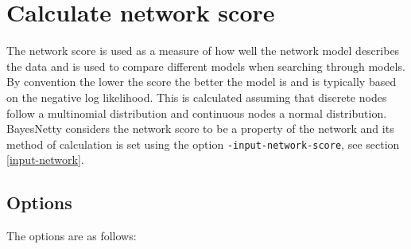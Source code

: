 \documentclass[a4paper,12pt]{article}
\newcommand{\code}[1]{{\footnotesize{{\tt #1}}}}
\begin{document}



\section{Calculate network score}
\label{calc-score}

The network score is used as a measure of how well the network model describes the data and is used to compare different models when searching through models. By convention the lower the score the better the model is and is typically based on the negative log likelihood. This is calculated assuming that discrete nodes follow a multinomial distribution and continuous nodes a normal distribution. BayesNetty considers the network score to be a property of the network and its method of calculation is set using the option \code{-input-network-score}, see  section \ref{input-network}. 
\subsection{Options}
\label{calc-score-options}

The options are as follows: 

{\begin{center}\end{center}}

\end{document}
